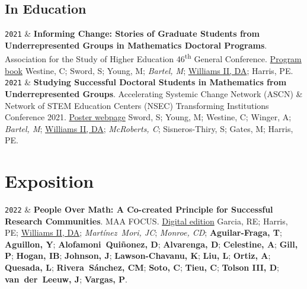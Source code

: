 \documentclass[10pt,a4paper]{article}
\newcommand{\LastName}{Williams II}
\newcommand{\Initials}{DA}
\newcommand{\Me}{\underline{\LastName, \Initials}}  %
\newcommand{\PEH}{Harris, PE}
\newcommand{\Rebecca}{Garcia, RE}
\newcommand{\Yasmin}{Aguillon, Y}
\newcommand{\Dylan}{Alvarenga, D}
\newcommand{\Carlos}{Mart\'{i}nez~Mori, JC}
\newcommand{\Cas}{Monroe, CD}
\newcommand{\Camelle}{Tieu, C}
\newcommand{\Michael}{Young, M}
\newcommand{\Sarah}{Sword, S}
\newcommand{\Aris}{Winger, A}
\newcommand{\Christian}{McRoberts, C}
\newcommand{\Maya}{Bartel, M}
\newcommand{\Simone}{Sisneros-Thiry, S}
\newcommand{\Miriam}{Gates, M}
\newcommand{\Carl}{Westine, C}
\newcommand{\Imhotep}{Hogan, IB}
\newcommand{\Tomas}{Aguilar-Fraga, T}
\newcommand{\Daniel}{Alofamoni~Quiñonez, D}
\newcommand{\Aalliyah}{Celestine, A}
\newcommand{\Parneet}{Gill, P}
\newcommand{\Jakeyl}{Johnson, J}
\newcommand{\Kobe}{Lawson-Chavanu, K}
\newcommand{\Lina}{Liu, L}
\newcommand{\Aaron}{Ortiz, A}
\newcommand{\Lauren}{Quesada, L}
\newcommand{\Cynthia}{Rivera~Sánchez, CM}
\newcommand{\Christopher}{Soto, C}
\newcommand{\Dirk}{Tolson III, D}
\newcommand{\Jacob}{van~der~Leeuw, J}
\newcommand{\Pamela}{Vargas, P}
\newcommand{\UGCollab}[1]{\textbf{#1}}
\newcommand{\GradCollab}[1]{\textit{#1}}
\newcommand{\Year}[1]{\fontsize{10pt}{0}\selectfont \texttt{#1}}
\newcommand{\DOI}[1]{DOI: \href{https://doi.org/#1}{#1}}
\newcommand{\GitHub}[1]{GitHub: \href{https://github.com/#1}{#1}}
\begin{document}
    \subsection{In Education}

\begin{EntriesTableYear}
\Year{2021}  &
  \textbf{Informing Change: Stories of Graduate Students from Underrepresented Groups in Mathematics Doctoral Programs}.
  \newline
  Association for the Study of Higher Education 46\textsuperscript{th} General Conference. \href{https://www.ashe.ws//Files/Past Conferences/ASHE 2021 Program Book.pdf}{Program book}
  \newline
  \Carl; \Sarah; \Michael; \GradCollab{\Maya}; \Me; \PEH.
  \\
\Year{2021}  &
  \textbf{Studying Successful Doctoral Students in Mathematics from Underrepresented Groups}.
  \newline
  Accelerating Systemic Change Network (ASCN) \& Network of STEM Education Centers (NSEC) Transforming Institutions Conference 2021. \href{https://ascnhighered.org/ASCN/transforming_institutions/2021/program/posters/session_c/2/243631.html}{Poster webpage}
  \newline
  \Sarah; \Michael; \Carl; \Aris; \GradCollab{\Maya}; \Me; \GradCollab{\Christian}; \Simone; \Miriam; \PEH.
 \end{EntriesTableYear}
\section{Exposition}

\begin{EntriesTableYear}
\Year{2022}  &
  \textbf{People Over Math: A Co-created Principle for Successful Research Communities}.
  \newline
  MAA FOCUS.
  \href{http://digitaleditions.walsworthprintgroup.com/publication/?m=7656\&i=749450\&p=26\&fbclid=IwAR19q6M4ZQ1I8uncyU-iuGHsHfz-6JHFiZFHrg9thmyGqXAESJYRlaHXijc\&ver=html5}{Digital edition}
  \newline
  \Rebecca; \PEH; \Me; \GradCollab{\Carlos}; \GradCollab{\Cas}; \UGCollab{\Tomas}; \UGCollab{\Yasmin}; \UGCollab{\Daniel}; \UGCollab{\Dylan}; \UGCollab{\Aalliyah}; \UGCollab{\Parneet}; \UGCollab{\Imhotep}; \UGCollab{\Jakeyl}; \UGCollab{\Kobe}; \UGCollab{\Lina}; \UGCollab{\Aaron}; \UGCollab{\Lauren}; \UGCollab{\Cynthia}; \UGCollab{\Christopher}; \UGCollab{\Camelle}; \UGCollab{\Dirk}; \UGCollab{\Jacob}; \UGCollab{\Pamela}.
 \end{EntriesTableYear}
\end{document}
